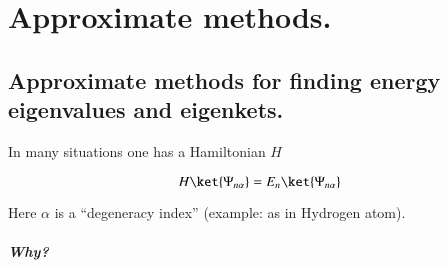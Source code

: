 %
%

\chapter{Approximate methods.}
\label{chap:qmTwoL2}
{}
\date{Sept 14, 2011}

\beginArtWithToc

%

\section{Approximate methods for finding energy eigenvalues and eigenkets.}

In many situations one has a Hamiltonian $H$

\begin{equation}\label{eqn:qmTwoL2:10}
H \ket{\Psi_{n \alpha}} = E_n \ket{\Psi_{n \alpha}}
\end{equation}

Here $\alpha$ is a ``degeneracy index'' (example: as in Hydrogen atom).

\paragraph{Why?}

